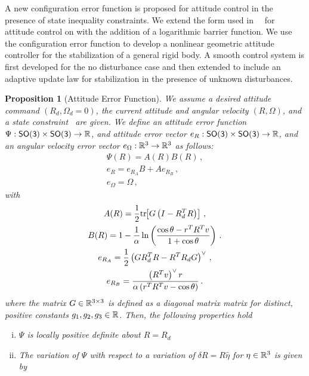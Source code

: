 \documentclass[letterpaper, 10 pt, conference]{ieeeconf}  %
\newtheorem{prop}{Proposition}
\begin{document}
A new configuration error function is proposed for attitude control in the presence of state inequality constraints.
We extend the form used in~~\cite{bullo2004,lee2011a} for attitude control on \SO with the addition of a logarithmic barrier function.
We use the configuration error function to develop a nonlinear geometric attitude controller for the stabilization of a general rigid body. 
A smooth control system is first developed for the no disturbance case and then extended to include an adaptive update law for stabilization in the presence of unknown disturbances.

\begin{prop}[Attitude Error Function] \label{prop:config_error}
We assume a desired attitude command \( ( R_d, \Omega_d = 0 ) \), the current attitude and angular velocity \( ( R, \Omega) \), and a state constraint~ are given.
We define an attitude error function \( \Psi : \mathsf{SO(3)} \times \mathsf{SO(3)} \to \mathbb{R} \), and attitude error vector \( e_R : \mathsf{SO(3)} \times \mathsf{SO(3)} \to \mathbb{R} \), and an angular velocity error vector \( e_\Omega : \mathbb{R}^3 \to \mathbb{R}^3 \) as follows:
\begin{gather}
	\Psi(R) = A(R) B(R) \, , \label{eqn:psi} \\
	e_R = e_{R_A} B + A e_{R_B} \, , \label{eqn:eR} \\
	e_\Omega = \Omega \, , \label{eqn:eW}
\end{gather}
with
\begin{gather}
	A(R) = \frac{1}{2} \mathrm{tr}\negthickspace\left[ G \left( I - R_d^T R\right) \right] \, , \label{eqn:A} \\
	B(R) = 1 - \frac{1}{\alpha} \ln \left( \frac{\cos \theta -  r^T R^T v}{1 + \cos \theta}\right) \, . \label{eqn:B} \\
	e_{R_A} = \frac{1}{2} \left( G R_d^T R - R^T R_d G \right) ^ \vee \, , \label{eqn:eRA} \\
	e_{R_B} = \frac{ \left( R^T v\right)^\vee r}{\alpha \left(r^T R^T v - \cos \theta \right)} \, . \label{eqn:eRB} 
\end{gather}	
where the matrix \( G \in \mathbb{R}^{3 \times 3} \) is defined as a diagonal matrix matrix for distinct, positive constants \( g_1, g_2, g_3 \in \mathbb{R} \).
Then, the following properties hold
\begin{enumerate}[(i)]
	\item \label{item:prop_psi_psd} \(\Psi\) is locally positive definite about \( R = R_d\)
	\item \label{item:prop_er} The variation of \( \Psi \) with respect to a variation of \( \delta R = R \hat{\eta} \) for \( \eta \in \mathbb{R}^3 \) is given by

\end{enumerate}
\end{prop}
\end{document}
